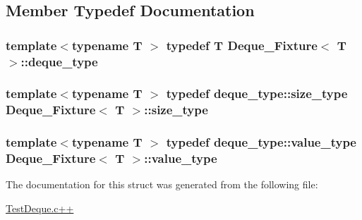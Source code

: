 \subsection{Member Typedef Documentation}
\hypertarget{structDeque__Fixture_aff55aebc9f3732e55b5e9afae069a6e7}{
\subsubsection[{deque\-\_\-type}]{\setlength{\rightskip}{0pt plus 5cm}template$<$typename T $>$ typedef T {\bf Deque\-\_\-\-Fixture}$<$ T $>$\-::{\bf deque\-\_\-type}}}\label{structDeque__Fixture_aff55aebc9f3732e55b5e9afae069a6e7}
\hypertarget{structDeque__Fixture_aaf7d8d8eda0003cc8727d9eab7f22086}{
\subsubsection[{size\-\_\-type}]{\setlength{\rightskip}{0pt plus 5cm}template$<$typename T $>$ typedef deque\-\_\-type\-::size\-\_\-type {\bf Deque\-\_\-\-Fixture}$<$ T $>$\-::{\bf size\-\_\-type}}}\label{structDeque__Fixture_aaf7d8d8eda0003cc8727d9eab7f22086}
\hypertarget{structDeque__Fixture_ad3f31d2190bcef2a8809aae173c159e9}{
\subsubsection[{value\-\_\-type}]{\setlength{\rightskip}{0pt plus 5cm}template$<$typename T $>$ typedef deque\-\_\-type\-::value\-\_\-type {\bf Deque\-\_\-\-Fixture}$<$ T $>$\-::{\bf value\-\_\-type}}}\label{structDeque__Fixture_ad3f31d2190bcef2a8809aae173c159e9}


The documentation for this struct was generated from the following file\-:\begin{DoxyCompactItemize}
\item 
\hyperlink{TestDeque_8c_09_09}{Test\-Deque.\-c++}\end{DoxyCompactItemize}
